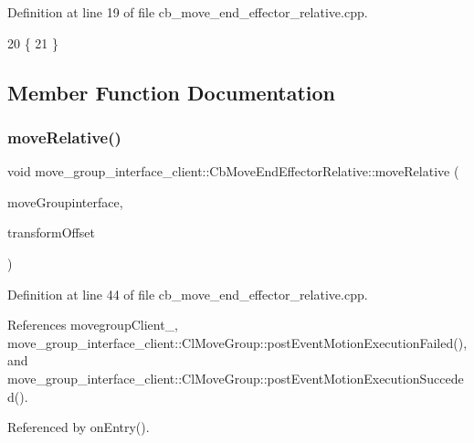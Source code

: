 Definition at line 19 of file cb\+\_\+move\+\_\+end\+\_\+effector\+\_\+relative.\+cpp.


\begin{DoxyCode}
20     \{
21     \}
\end{DoxyCode}


\subsection{Member Function Documentation}
\mbox{\label{classmove__group__interface__client_1_1CbMoveEndEffectorRelative_a8f64d14c4a398b455b1953ae61cc58bc}} 
\subsubsection{\texorpdfstring{move\+Relative()}{moveRelative()}}
{\footnotesize\ttfamily void move\+\_\+group\+\_\+interface\+\_\+client\+::\+Cb\+Move\+End\+Effector\+Relative\+::move\+Relative (\begin{DoxyParamCaption}\item[{moveit\+::planning\+\_\+interface\+::\+Move\+Group\+Interface \&}]{move\+Groupinterface,  }\item[{geometry\+\_\+msgs\+::\+Transform \&}]{transform\+Offset }\end{DoxyParamCaption})\hspace{0.3cm}{\ttfamily [protected]}}



Definition at line 44 of file cb\+\_\+move\+\_\+end\+\_\+effector\+\_\+relative.\+cpp.



References movegroup\+Client\+\_\+, move\+\_\+group\+\_\+interface\+\_\+client\+::\+Cl\+Move\+Group\+::post\+Event\+Motion\+Execution\+Failed(), and move\+\_\+group\+\_\+interface\+\_\+client\+::\+Cl\+Move\+Group\+::post\+Event\+Motion\+Execution\+Succeded().



Referenced by on\+Entry().


